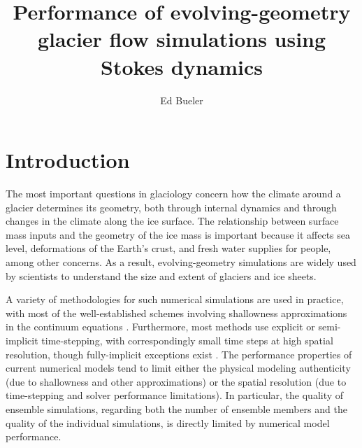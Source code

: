 \documentclass[letterpaper,final,12pt,reqno]{amsart}
\begin{document}
\title[Performance of evolving-geometry glacier flow simulations]{Performance of evolving-geometry glacier flow simulations using Stokes dynamics}

\author{Ed Bueler}

\maketitle

\thispagestyle{empty}
\bigskip

\section{Introduction} \label{sec:intro}

The most important questions in glaciology concern how the climate around a glacier determines its geometry, both through internal dynamics and through changes in the climate along the ice surface.  The relationship between surface mass inputs and the geometry of the ice mass is important because it affects sea level, deformations of the Earth's crust, and fresh water supplies for people, among other concerns.  As a result, evolving-geometry simulations are widely used by scientists to understand the size and extent of glaciers and ice sheets.

A variety of methodologies for such numerical simulations are used in practice, with most of the well-established schemes involving shallowness approximations in the continuum equations \cite[for example]{Hoffmanetal2018,Lipscombetal2019,Winkelmannetal2011}.  Furthermore, most methods use explicit or semi-implicit time-stepping, with correspondingly small time steps at high spatial resolution, though fully-implicit exceptions exist \cite{Brinkerhoffetal2017,Bueler2016}.  The performance properties of current numerical models tend to limit either the physical modeling authenticity (due to shallowness and other approximations) or the spatial resolution (due to time-stepping and solver performance limitations).  In particular, the quality of ensemble simulations, regarding both the number of ensemble members and the quality of the individual simulations, is directly limited by numerical model performance.
\end{document}
